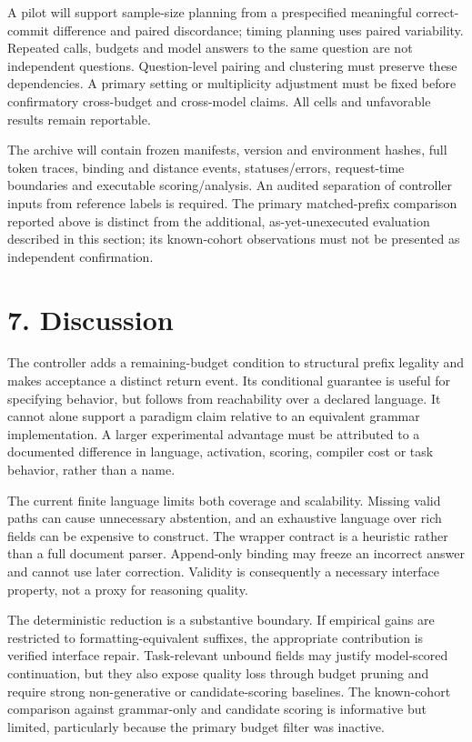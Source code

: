 \documentclass[
  12pt,
  a4paper,
]{article}
\begin{document}
A pilot will support sample-size planning from a prespecified meaningful correct-commit difference and paired discordance; timing planning uses paired variability. Repeated calls, budgets and model answers to the same question are not independent questions. Question-level pairing and clustering must preserve these dependencies. A primary setting or multiplicity adjustment must be fixed before confirmatory cross-budget and cross-model claims. All cells and unfavorable results remain reportable.

The archive will contain frozen manifests, version and environment hashes, full token traces, binding and distance events, statuses/errors, request-time boundaries and executable scoring/analysis. An audited separation of controller inputs from reference labels is required. The primary matched-prefix comparison reported above is distinct from the additional, as-yet-unexecuted evaluation described in this section; its known-cohort observations must not be presented as independent confirmation.

\section{7. Discussion}

The controller adds a remaining-budget condition to structural prefix legality and makes acceptance a distinct return event. Its conditional guarantee is useful for specifying behavior, but follows from reachability over a declared language. It cannot alone support a paradigm claim relative to an equivalent grammar implementation. A larger experimental advantage must be attributed to a documented difference in language, activation, scoring, compiler cost or task behavior, rather than a name.

The current finite language limits both coverage and scalability. Missing valid paths can cause unnecessary abstention, and an exhaustive language over rich fields can be expensive to construct. The wrapper contract is a heuristic rather than a full document parser. Append-only binding may freeze an incorrect answer and cannot use later correction. Validity is consequently a necessary interface property, not a proxy for reasoning quality.

The deterministic reduction is a substantive boundary. If empirical gains are restricted to formatting-equivalent suffixes, the appropriate contribution is verified interface repair. Task-relevant unbound fields may justify model-scored continuation, but they also expose quality loss through budget pruning and require strong non-generative or candidate-scoring baselines. The known-cohort comparison against grammar-only and candidate scoring is informative but limited, particularly because the primary budget filter was inactive.
\end{document}
